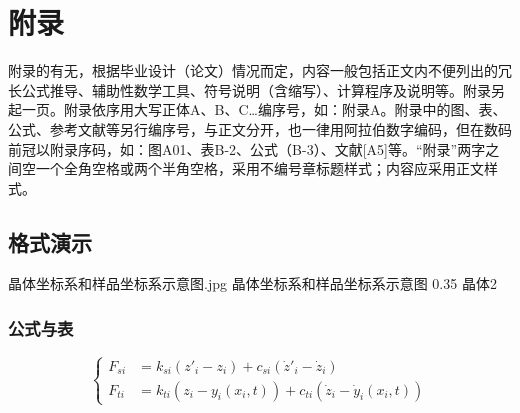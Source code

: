 \chapter{\texorpdfstring{附\quad 录}{附录}} %

\begin{appendixenv}

附录的有无，根据毕业设计（论文）情况而定，内容一般包括正文内不便列出的冗长公式推导、辅助性数学工具、符号说明（含缩写）、计算程序及说明等。附录另起一页。附录依序用大写正体A、B、C…编序号，如：附录A。附录中的图、表、公式、参考文献等另行编序号，与正文分开，也一律用阿拉伯数字编码，但在数码前冠以附录序码，如：图A01、表B-2、公式（B-3）、文献[A5]等。“附录”两字之间空一个全角空格或两个半角空格，采用不编号章标题样式；内容应采用正文样式。

\section{格式演示}

            {晶体坐标系和样品坐标系示意图.jpg}
            {晶体坐标系和样品坐标系示意图}
            {0.35}
            {晶体2}

\vspace{-20pt}  %

\subsection{公式与表}

\vspace{-20pt}  %

\begin{equation}
    \begin{cases}
        F_{si} &= k_{si}(z'_i-z_i)+c_{si}(\dot{z}'_i-\dot{z}_i) \\
        F_{ti} &= k_{ti}(z_i-y_i(x_i,t))+c_{ti}(\dot{z}_i-\dot{y}_i(x_i,t))
    \end{cases}
    \label{apequ}
\end{equation}

\vspace{-12pt}  %


\end{appendixenv}
